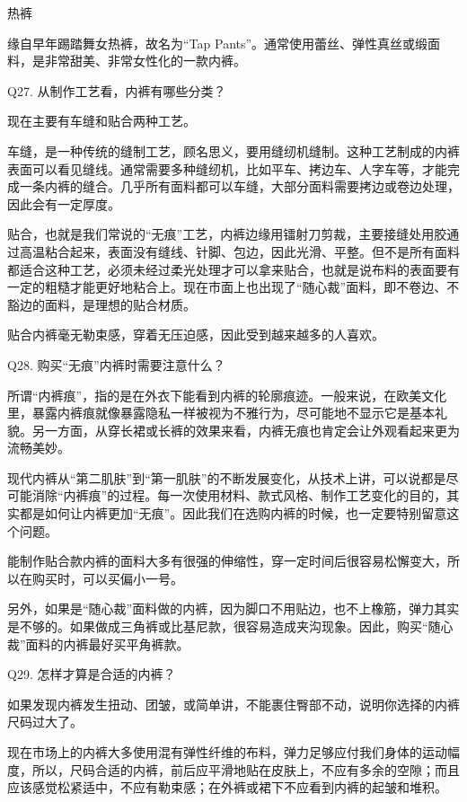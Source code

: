 \documentclass[12pt,UTF8]{ctexbook}
\begin{document}
热裤

缘自早年踢踏舞女热裤，故名为“Tap Pants”。通常使用蕾丝、弹性真丝或缎面料，是非常甜美、非常女性化的一款内裤。





Q27. 从制作工艺看，内裤有哪些分类？


现在主要有车缝和贴合两种工艺。

车缝，是一种传统的缝制工艺，顾名思义，要用缝纫机缝制。这种工艺制成的内裤表面可以看见缝线。通常需要多种缝纫机，比如平车、拷边车、人字车等，才能完成一条内裤的缝合。几乎所有面料都可以车缝，大部分面料需要拷边或卷边处理，因此会有一定厚度。

贴合，也就是我们常说的“无痕”工艺，内裤边缘用镭射刀剪裁，主要接缝处用胶通过高温粘合起来，表面没有缝线、针脚、包边，因此光滑、平整。但不是所有面料都适合这种工艺，必须未经过柔光处理才可以拿来贴合，也就是说布料的表面要有一定的粗糙才能更好地粘合上。现在市面上也出现了“随心裁”面料，即不卷边、不豁边的面料，是理想的贴合材质。

贴合内裤毫无勒束感，穿着无压迫感，因此受到越来越多的人喜欢。





Q28. 购买“无痕”内裤时需要注意什么？


所谓“内裤痕”，指的是在外衣下能看到内裤的轮廓痕迹。一般来说，在欧美文化里，暴露内裤痕就像暴露隐私一样被视为不雅行为，尽可能地不显示它是基本礼貌。另一方面，从穿长裙或长裤的效果来看，内裤无痕也肯定会让外观看起来更为流畅美妙。

现代内裤从“第二肌肤”到“第一肌肤”的不断发展变化，从技术上讲，可以说都是尽可能消除“内裤痕”的过程。每一次使用材料、款式风格、制作工艺变化的目的，其实都是如何让内裤更加“无痕”。因此我们在选购内裤的时候，也一定要特别留意这个问题。

能制作贴合款内裤的面料大多有很强的伸缩性，穿一定时间后很容易松懈变大，所以在购买时，可以买偏小一号。

另外，如果是“随心裁”面料做的内裤，因为脚口不用贴边，也不上橡筋，弹力其实是不够的。如果做成三角裤或比基尼款，很容易造成夹沟现象。因此，购买“随心裁”面料的内裤最好买平角裤款。





Q29. 怎样才算是合适的内裤？


如果发现内裤发生扭动、团皱，或简单讲，不能裹住臀部不动，说明你选择的内裤尺码过大了。

现在市场上的内裤大多使用混有弹性纤维的布料，弹力足够应付我们身体的运动幅度，所以，尺码合适的内裤，前后应平滑地贴在皮肤上，不应有多余的空隙；而且应该感觉松紧适中，不应有勒束感；在外裤或裙下不应看到内裤的起皱和堆积。
\end{document}
